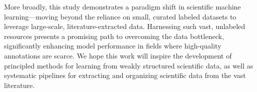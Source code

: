 More broadly, this study demonstrates a paradigm shift in scientific machine learning—moving beyond the reliance on small, curated labeled datasets to leverage large-scale, literature-extracted data. Harnessing such vast, unlabeled resources presents a promising path to overcoming the data bottleneck, significantly enhancing model performance in fields where high-quality annotations are scarce. 
We hope this work will inspire the development of principled methods for learning from weakly structured scientific data, as well as systematic pipelines for extracting and organizing scientific data from the vast literature.
